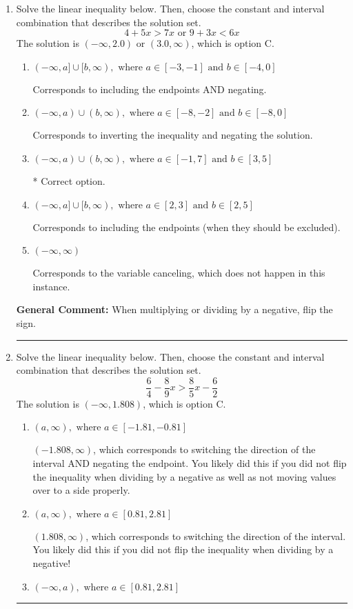 \documentclass{extbook}[14pt]
\newcommand{\litem}[1]{\item #1

\rule{\textwidth}{0.4pt}}
\begin{document}
\begin{enumerate}\litem{
Solve the linear inequality below. Then, choose the constant and interval combination that describes the solution set.
\[ 4 + 5 x > 7 x \text{ or } 9 + 3 x < 6 x \]The solution is \( (-\infty, 2.0) \text{ or } (3.0, \infty) \), which is option C.\begin{enumerate}[label=\Alph*.]
\item \( (-\infty, a] \cup [b, \infty), \text{ where } a \in [-3, -1] \text{ and } b \in [-4, 0] \)

Corresponds to including the endpoints AND negating.
\item \( (-\infty, a) \cup (b, \infty), \text{ where } a \in [-8, -2] \text{ and } b \in [-8, 0] \)

Corresponds to inverting the inequality and negating the solution.
\item \( (-\infty, a) \cup (b, \infty), \text{ where } a \in [-1, 7] \text{ and } b \in [3, 5] \)

 * Correct option.
\item \( (-\infty, a] \cup [b, \infty), \text{ where } a \in [2, 3] \text{ and } b \in [2, 5] \)

Corresponds to including the endpoints (when they should be excluded).
\item \( (-\infty, \infty) \)

Corresponds to the variable canceling, which does not happen in this instance.
\end{enumerate}

\textbf{General Comment:} When multiplying or dividing by a negative, flip the sign.
}
\litem{
Solve the linear inequality below. Then, choose the constant and interval combination that describes the solution set.
\[ \frac{6}{4} - \frac{8}{9} x > \frac{8}{5} x - \frac{6}{2} \]The solution is \( (-\infty, 1.808) \), which is option C.\begin{enumerate}[label=\Alph*.]
\item \( (a, \infty), \text{ where } a \in [-1.81, -0.81] \)

 $(-1.808, \infty)$, which corresponds to switching the direction of the interval AND negating the endpoint. You likely did this if you did not flip the inequality when dividing by a negative as well as not moving values over to a side properly.
\item \( (a, \infty), \text{ where } a \in [0.81, 2.81] \)

 $(1.808, \infty)$, which corresponds to switching the direction of the interval. You likely did this if you did not flip the inequality when dividing by a negative!
\item \( (-\infty, a), \text{ where } a \in [0.81, 2.81] \)


\end{enumerate}}
\end{enumerate}
\end{document}

